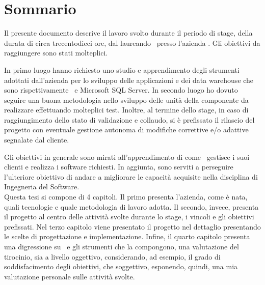 
\cleardoublepage
{}
{}
\begingroup
\let\clearpage\relax
\let\cleardoublepage\relax
\let\cleardoublepage\relax

\chapter*{Sommario}

Il presente documento descrive il lavoro svolto durante il periodo di stage, della durata di circa trecentodieci ore, dal laureando \myName\ presso l'azienda \azienda .
Gli obiettivi da raggiungere sono stati molteplici.

In primo luogo hanno richiesto uno studio e apprendimento degli strumenti adottati dall'azienda per lo sviluppo delle applicazioni e dei data warehouse che sono rispettivamente \inde\ e  Microsoft SQL Server. In secondo luogo ho dovuto seguire una buona metodologia nello sviluppo delle unità della componente da realizzare effettuando molteplici test. Inoltre, al termine dello stage, in caso di raggiungimento dello stato di validazione e collaudo, si è prefissato il rilascio del progetto con eventuale gestione autonoma di modifiche correttive e/o adattive segnalate dal cliente.

Gli obiettivi in generale sono mirati all'apprendimento di come \azienda\ gestisce i suoi clienti e realizza i software richiesti. In aggiunta, sono serviti a perseguire l'ulteriore obiettivo di andare a migliorare le capacità acquisite nella disciplina di Ingegneria del Software.
\\

Questa tesi si compone di 4 capitoli. 
Il primo presenta l'azienda, come è nata, quali tecnologie e quale metodologia di lavoro adotta. Il secondo, invece, presenta il progetto al centro delle attività svolte durante lo stage, i vincoli e gli obiettivi prefissati. Nel terzo capitolo viene presentato il progetto nel dettaglio presentando le scelte di progettazione e implementazione.
Infine, il quarto capitolo presenta una digressione su \inde\ e gli strumenti che la compongono, una valutazione del tirocinio, sia a livello oggettivo, considerando, ad esempio, il grado di soddisfacimento degli obiettivi, che soggettivo, esponendo, quindi, una mia valutazione personale sulle attività svolte.


%
%

\endgroup			

\vfill

